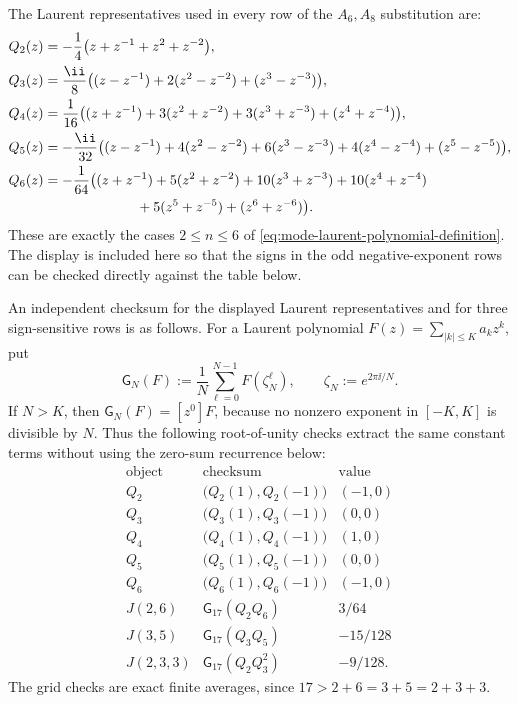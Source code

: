 The Laurent representatives used in every row of the \(A_6,A_8\)
substitution are:
\begin{align}
Q_2(z)
&=-\frac14\bigl(z+z^{-1}+z^2+z^{-2}\bigr),
\label{eq:appendix-d-explicit-q2}\\
Q_3(z)
&=\frac{\ii}{8}\bigl((z-z^{-1})+2(z^2-z^{-2})+(z^3-z^{-3})\bigr),
\label{eq:appendix-d-explicit-q3}\\
Q_4(z)
&=\frac1{16}\bigl((z+z^{-1})+3(z^2+z^{-2})
  +3(z^3+z^{-3})+(z^4+z^{-4})\bigr),
\label{eq:appendix-d-explicit-q4}\\
Q_5(z)
&=-\frac{\ii}{32}\bigl((z-z^{-1})+4(z^2-z^{-2})
  +6(z^3-z^{-3})+4(z^4-z^{-4})+(z^5-z^{-5})\bigr),
\label{eq:appendix-d-explicit-q5}\\
Q_6(z)
&=-\frac1{64}\bigl((z+z^{-1})+5(z^2+z^{-2})
  +10(z^3+z^{-3})+10(z^4+z^{-4}) \nonumber\\
&\hspace{6.7em}
  +5(z^5+z^{-5})+(z^6+z^{-6})\bigr).
\label{eq:appendix-d-explicit-q6}
\end{align}
These are exactly the cases \(2\le n\le6\) of
\eqref{eq:mode-laurent-polynomial-definition}.  The display is included here
so that the signs in the odd negative-exponent rows can be checked directly
against the table below.

An independent checksum for the displayed Laurent representatives and for
three sign-sensitive rows is as follows.  For a Laurent polynomial
\(F(z)=\sum_{|k|\le K}a_kz^k\), put
\[
\mathsf G_N(F):=\frac1N\sum_{\ell=0}^{N-1}F(\zeta_N^\ell),
\qquad \zeta_N:=e^{2\pi\ii/N}.
\]
If \(N>K\), then \(\mathsf G_N(F)=[z^0]F\), because no nonzero exponent in
\([-K,K]\) is divisible by \(N\).  Thus the following root-of-unity checks
extract the same constant terms without using the zero-sum recurrence below:
\[
\begin{array}{c|c|c}
\text{object}&\text{checksum}&\text{value}\\
\hline
Q_2&\bigl(Q_2(1),Q_2(-1)\bigr)&(-1,0)\\
Q_3&\bigl(Q_3(1),Q_3(-1)\bigr)&(0,0)\\
Q_4&\bigl(Q_4(1),Q_4(-1)\bigr)&(1,0)\\
Q_5&\bigl(Q_5(1),Q_5(-1)\bigr)&(0,0)\\
Q_6&\bigl(Q_6(1),Q_6(-1)\bigr)&(-1,0)\\
J(2,6)&\mathsf G_{17}(Q_2Q_6)&3/64\\
J(3,5)&\mathsf G_{17}(Q_3Q_5)&-15/128\\
J(2,3,3)&\mathsf G_{17}(Q_2Q_3^2)&-9/128 .
\end{array}
\]
The grid checks are exact finite averages, since
\(17>2+6=3+5=2+3+3\).


